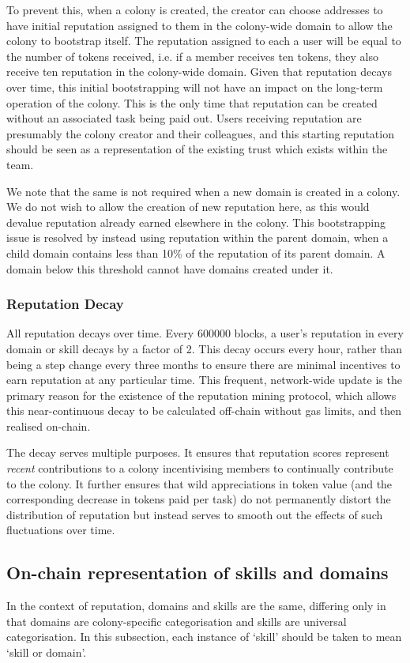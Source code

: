 To prevent this, when a colony is created, the creator can choose addresses to have initial reputation assigned to them in the colony-wide domain to allow the colony to bootstrap itself. The reputation assigned to each a user will be equal to the number of tokens received, i.e. if a member receives ten tokens, they also receive ten reputation in the colony-wide domain. Given that reputation decays over time, this initial bootstrapping will not have an impact on the long-term operation of the colony. This is the only time that reputation can be created without an associated task being paid out. Users receiving reputation are presumably the colony creator and their colleagues, and this starting reputation should be seen as a representation of the existing trust which exists within the team. 

We note that the same is not required when a new domain is created in a colony. We do not wish to allow the creation of new reputation here, as this would devalue reputation already earned elsewhere in the colony. This bootstrapping issue is resolved by instead using reputation within the parent domain, when a child domain contains less than 10\% of the reputation of its parent domain. A domain below this threshold cannot have domains created under it.

\subsubsection{Reputation Decay}
All reputation decays over time. Every 600000 blocks, a user's reputation in every domain or skill decays by a factor of 2. This decay occurs every hour, rather than being a step change every three months to ensure there are minimal incentives to earn reputation at any particular time. This frequent, network-wide update is the primary reason for the existence of the reputation mining protocol, which allows this near-continuous decay to be calculated off-chain without gas limits, and then realised on-chain. 

The decay serves multiple purposes. It ensures that reputation scores represent \emph{recent} contributions to a colony incentivising members to continually contribute to the colony. It further ensures that wild appreciations in token value (and the corresponding decrease in tokens paid per task) do not permanently distort the distribution of reputation but instead serves to smooth out the effects of such fluctuations over time.

\subsection{On-chain representation of skills and domains}\label{subsec:on-chain-representation-of-skills}
In the context of reputation, domains and skills are the same, differing only in that domains are colony-specific categorisation and skills are universal categorisation. In this subsection, each instance of `skill' should be taken to mean `skill or domain'.

